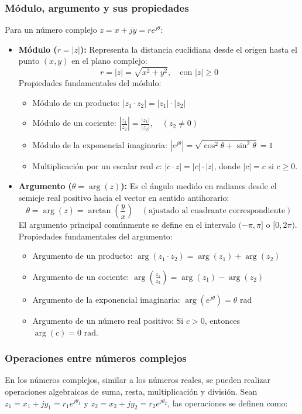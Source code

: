 \documentclass[11pt,a4paper]{article}
\begin{document}
\subsubsection{Módulo, argumento y sus propiedades}
Para un número complejo $z = x + jy = r e^{j\theta}$:
\begin{itemize}
    \item \textbf{Módulo ($r = |z|$):} Representa la distancia euclidiana desde el origen hasta el punto $(x, y)$ en el plano complejo:
    \[
    r = |z| = \sqrt{x^2 + y^2}, \quad \text{con } |z| \ge 0
    \]
    Propiedades fundamentales del módulo:
    \begin{itemize}
        \item Módulo de un producto: $|z_1 \cdot z_2| = |z_1| \cdot |z_2|$
        \item Módulo de un cociente: $\left|\frac{z_1}{z_2}\right| = \frac{|z_1|}{|z_2|}, \quad (z_2 \neq 0)$
        \item Módulo de la exponencial imaginaria: $|e^{j\theta}| = \sqrt{\cos^2\theta + \sin^2\theta} = 1$
        \item Multiplicación por un escalar real $c$: $|c \cdot z| = |c| \cdot |z|$, donde $|c| = c$ si $c \ge 0$.
    \end{itemize}

    \item \textbf{Argumento ($\theta = \arg(z)$):} Es el ángulo medido en radianes desde el semieje real positivo hacia el vector en sentido antihorario:
    \[
    \theta = \arg(z) = \arctan\left(\frac{y}{x}\right) \quad (\text{ajustado al cuadrante correspondiente})
    \]
    El argumento principal comúnmente se define en el intervalo $(-\pi, \pi]$ o $[0, 2\pi)$. Propiedades fundamentales del argumento:
    \begin{itemize}
        \item Argumento de un producto: $\arg(z_1 \cdot z_2) = \arg(z_1) + \arg(z_2)$
        \item Argumento de un cociente: $\arg\left(\frac{z_1}{z_2}\right) = \arg(z_1) - \arg(z_2)$
        \item Argumento de la exponencial imaginaria: $\arg(e^{j\theta}) = \theta \text{ rad}$
        \item Argumento de un número real positivo: Si $c > 0$, entonces $\arg(c) = 0 \text{ rad}$.
    \end{itemize}
\end{itemize}

\subsubsection{Operaciones entre números complejos}
En los números complejos, similar a los números reales, se pueden realizar operaciones algebraicas de suma, resta, multiplicación y división. Sean $z_1 = x_1 + jy_1 = r_1 e^{j\theta_1}$ y $z_2 = x_2 + jy_2 = r_2 e^{j\theta_2}$, las operaciones se definen como:
\end{document}
